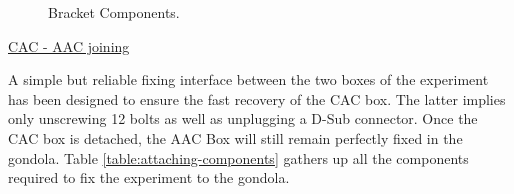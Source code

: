 \begin{figure}[H]
    \noindent{}
    \caption{Bracket Components.}
    \label{fig:bracket}
\end{figure}

\bigskip
\underline{CAC - AAC joining}

\smallskip
A simple but reliable fixing interface between the two boxes of the experiment has been designed to ensure the fast recovery of the CAC box. The latter implies only unscrewing 12 bolts as well as unplugging a D-Sub connector. Once the CAC box is detached, the AAC Box will still remain perfectly fixed in the gondola. Table \ref{table:attaching-components} gathers up all the components required to fix the experiment to the gondola.

